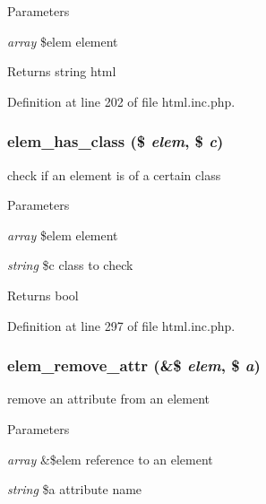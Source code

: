 \begin{DoxyParams}{Parameters}
\item[{\em array}]\$elem element \end{DoxyParams}
\begin{DoxyReturn}{Returns}
string html 
\end{DoxyReturn}


Definition at line 202 of file html.inc.php.

\hypertarget{html_8inc_8php_ab1019c4b75181c1c1af10e1c1e5e197d}{
\subsubsection[{elem\_\-has\_\-class}]{\setlength{\rightskip}{0pt plus 5cm}elem\_\-has\_\-class (\$ {\em elem}, \/  \$ {\em c})}}
\label{html_8inc_8php_ab1019c4b75181c1c1af10e1c1e5e197d}
check if an element is of a certain class


\begin{DoxyParams}{Parameters}
\item[{\em array}]\$elem element \item[{\em string}]\$c class to check \end{DoxyParams}
\begin{DoxyReturn}{Returns}
bool 
\end{DoxyReturn}


Definition at line 297 of file html.inc.php.

\hypertarget{html_8inc_8php_aeb7074172d9164f69e64967b6bcdc643}{
\subsubsection[{elem\_\-remove\_\-attr}]{\setlength{\rightskip}{0pt plus 5cm}elem\_\-remove\_\-attr (\&\$ {\em elem}, \/  \$ {\em a})}}
\label{html_8inc_8php_aeb7074172d9164f69e64967b6bcdc643}
remove an attribute from an element


\begin{DoxyParams}{Parameters}
\item[{\em array}]\&\$elem reference to an element \item[{\em string}]\$a attribute name \end{DoxyParams}


